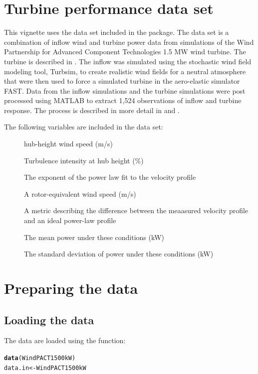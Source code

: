 \documentclass[nojss]{jss}\usepackage[]{graphicx}\usepackage[]{color}
\makeatletter
\newcommand{\hlstd}[1]{\textcolor[rgb]{0.345,0.345,0.345}{#1}}%
\newcommand{\hlkwb}[1]{\textcolor[rgb]{0.69,0.353,0.396}{#1}}%
\newcommand{\hlkwd}[1]{\textcolor[rgb]{0.737,0.353,0.396}{\textbf{#1}}}%
\newenvironment{kframe}{%
 \def\at@end@of@kframe{}%
 \ifinner\ifhmode%
  \def\at@end@of@kframe{\end{minipage}}%
  \begin{minipage}{\columnwidth}%
 \fi\fi%
 \def\FrameCommand##1{\hskip\@totalleftmargin \hskip-\fboxsep
 \colorbox{shadecolor}{##1}\hskip-\fboxsep
     \hskip-\linewidth \hskip-\@totalleftmargin \hskip\columnwidth}%
 \MakeFramed {\advance\hsize-\width
   \@totalleftmargin\z@ \linewidth\hsize
   \@setminipage}}%
 {\par\unskip\endMakeFramed%
 \at@end@of@kframe}
\newenvironment{knitrout}{}{} %
\newcommand{\pname}{PowerPerformance}
\makeatother
\begin{document}
\section{Turbine performance data set}
This vignette uses the  data set included in the \pkg{\pname} package. The  data set is a combination of inflow wind and turbine power data from simulations of the Wind Partnership for Advanced Component Technologies 1.5 MW wind turbine. The turbine is described in \citet{Poore_2003_a, Malcolm_32495}. The inflow was simulated using the stochastic wind field modeling tool, Turbsim, to create realistic wind fields for a neutral atmosphere that were then used to force a simulated turbine in the aero-elastic simulator FAST. Data from the inflow simulations and the turbine simulations were post processed using MATLAB to extract 1,524 observations of inflow and turbine response. The process is described in more detail in \citet{Clifton_2013_a} and \citet{Clifton_2013_d}. 

The following variables are included in the  data set:
\begin{description}
\item[]{hub-height wind speed (m/s)}
\item[]{Turbulence intensity at hub height (\%)}
\item[]{The exponent of the power law fit to the velocity profile}
\item[]{A rotor-equivalent wind speed (m/s)}
\item[]{A metric describing the difference between the meaasured velocity profile and an ideal power-law profile}
\item[]{The mean power under these conditions (kW)}
\item[]{The standard deviation of power under these conditions (kW)}
\end{description}

\section{Preparing the data}
\subsection{Loading the data}
The  data are loaded using the  function:
\begin{knitrout}
\color{fgcolor}\begin{kframe}
\begin{alltt}
\hlkwd{data}\hlstd{(WindPACT1500kW)}
\hlstd{data.in} \hlkwb{<-} \hlstd{WindPACT1500kW}
\end{alltt}
\end{kframe}
\end{knitrout}
\end{document}
